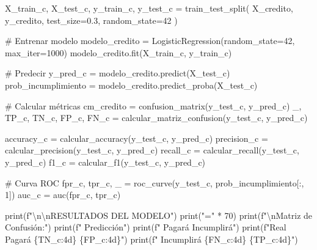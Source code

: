 \documentclass[
  doc,
  floatsintext,
  longtable,
  a4paper,
  nolmodern,
  notxfonts,
  notimes,
  12pt,
  colorlinks=true,linkcolor=blue,citecolor=blue,urlcolor=blue]{apa7}
\newenvironment{Shaded}{\begin{snugshade}}{\end{snugshade}}
\newcommand{\BuiltInTok}[1]{\textcolor[rgb]{0.00,0.23,0.31}{#1}}
\newcommand{\CharTok}[1]{\textcolor[rgb]{0.13,0.47,0.30}{#1}}
\newcommand{\CommentTok}[1]{\textcolor[rgb]{0.37,0.37,0.37}{#1}}
\newcommand{\DecValTok}[1]{\textcolor[rgb]{0.68,0.00,0.00}{#1}}
\newcommand{\FloatTok}[1]{\textcolor[rgb]{0.68,0.00,0.00}{#1}}
\newcommand{\NormalTok}[1]{\textcolor[rgb]{0.00,0.23,0.31}{#1}}
\newcommand{\OperatorTok}[1]{\textcolor[rgb]{0.37,0.37,0.37}{#1}}
\newcommand{\SpecialCharTok}[1]{\textcolor[rgb]{0.37,0.37,0.37}{#1}}
\newcommand{\SpecialStringTok}[1]{\textcolor[rgb]{0.13,0.47,0.30}{#1}}
\newcommand{\StringTok}[1]{\textcolor[rgb]{0.13,0.47,0.30}{#1}}
\begin{document}
\begin{Shaded}
\begin{Highlighting}[]
\NormalTok{X\_train\_c, X\_test\_c, y\_train\_c, y\_test\_c }\OperatorTok{=}\NormalTok{ train\_test\_split(}
\NormalTok{    X\_credito, y\_credito, test\_size}\OperatorTok{=}\FloatTok{0.3}\NormalTok{, random\_state}\OperatorTok{=}\DecValTok{42}
\NormalTok{)}

\CommentTok{\# Entrenar modelo}
\NormalTok{modelo\_credito }\OperatorTok{=}\NormalTok{ LogisticRegression(random\_state}\OperatorTok{=}\DecValTok{42}\NormalTok{, max\_iter}\OperatorTok{=}\DecValTok{1000}\NormalTok{)}
\NormalTok{modelo\_credito.fit(X\_train\_c, y\_train\_c)}

\CommentTok{\# Predecir}
\NormalTok{y\_pred\_c }\OperatorTok{=}\NormalTok{ modelo\_credito.predict(X\_test\_c)}
\NormalTok{prob\_incumplimiento }\OperatorTok{=}\NormalTok{ modelo\_credito.predict\_proba(X\_test\_c)}

\CommentTok{\# Calcular métricas}
\NormalTok{cm\_credito }\OperatorTok{=}\NormalTok{ confusion\_matrix(y\_test\_c, y\_pred\_c)}
\NormalTok{\_, TP\_c, TN\_c, FP\_c, FN\_c }\OperatorTok{=}\NormalTok{ calcular\_matriz\_confusion(y\_test\_c, y\_pred\_c)}

\NormalTok{accuracy\_c }\OperatorTok{=}\NormalTok{ calcular\_accuracy(y\_test\_c, y\_pred\_c)}
\NormalTok{precision\_c }\OperatorTok{=}\NormalTok{ calcular\_precision(y\_test\_c, y\_pred\_c)}
\NormalTok{recall\_c }\OperatorTok{=}\NormalTok{ calcular\_recall(y\_test\_c, y\_pred\_c)}
\NormalTok{f1\_c }\OperatorTok{=}\NormalTok{ calcular\_f1(y\_test\_c, y\_pred\_c)}

\CommentTok{\# Curva ROC}
\NormalTok{fpr\_c, tpr\_c, \_ }\OperatorTok{=}\NormalTok{ roc\_curve(y\_test\_c, prob\_incumplimiento[:, }\DecValTok{1}\NormalTok{])}
\NormalTok{auc\_c }\OperatorTok{=}\NormalTok{ auc(fpr\_c, tpr\_c)}

\BuiltInTok{print}\NormalTok{(}\SpecialStringTok{f"}\CharTok{\textbackslash{}n\textbackslash{}n}\SpecialStringTok{RESULTADOS DEL MODELO"}\NormalTok{)}
\BuiltInTok{print}\NormalTok{(}\StringTok{"="} \OperatorTok{*} \DecValTok{70}\NormalTok{)}
\BuiltInTok{print}\NormalTok{(}\SpecialStringTok{f"}\CharTok{\textbackslash{}n}\SpecialStringTok{Matriz de Confusión:"}\NormalTok{)}
\BuiltInTok{print}\NormalTok{(}\SpecialStringTok{f"                    Predicción"}\NormalTok{)}
\BuiltInTok{print}\NormalTok{(}\SpecialStringTok{f"              Pagará  Incumplirá"}\NormalTok{)}
\BuiltInTok{print}\NormalTok{(}\SpecialStringTok{f"Real  Pagará    }\SpecialCharTok{\{}\NormalTok{TN\_c}\SpecialCharTok{:4d\}}\SpecialStringTok{      }\SpecialCharTok{\{}\NormalTok{FP\_c}\SpecialCharTok{:4d\}}\SpecialStringTok{"}\NormalTok{)}
\BuiltInTok{print}\NormalTok{(}\SpecialStringTok{f"   Incumplirá   }\SpecialCharTok{\{}\NormalTok{FN\_c}\SpecialCharTok{:4d\}}\SpecialStringTok{      }\SpecialCharTok{\{}\NormalTok{TP\_c}\SpecialCharTok{:4d\}}\SpecialStringTok{"}\NormalTok{)}


\end{Highlighting}
\end{Shaded}
\end{document}
